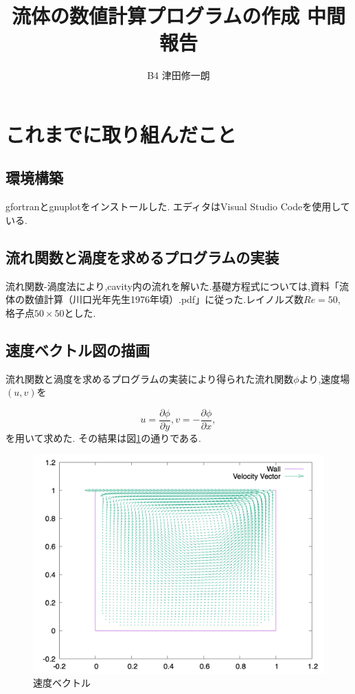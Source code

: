 \documentclass[upLaTeX,a4paper]{jsarticle}
\title{流体の数値計算プログラムの作成 中間報告}
\author{B4 津田修一朗}
\date{}
\begin{document}
\maketitle

\section{これまでに取り組んだこと}
\subsection{環境構築}
gfortranとgnuplotをインストールした.
エディタはVisual Studio Codeを使用している.

\subsection{流れ関数と渦度を求めるプログラムの実装}
流れ関数-渦度法により,cavity内の流れを解いた.基礎方程式については,資料「流体の数値計算（川口光年先生1976年頃）.pdf」に従った.レイノルズ数$Re = 50$, 格子点$50\times 50$とした.

\subsection{速度ベクトル図の描画}
流れ関数と渦度を求めるプログラムの実装により得られた流れ関数$\phi$より,速度場$(u, v)$を

\begin{equation}
  u = \frac{\partial \phi}{\partial y}, v = - \frac{\partial \phi}{\partial x},
\end{equation}
を用いて求めた.
その結果は図\ref{fig:velocity_vector}の通りである.
\begin{figure}[H]
  \includegraphics[width=15cm]{outputs/img/velocity_vector_50.png}
  \caption{速度ベクトル}
  \label{fig:velocity_vector}
\end{figure}
\end{document}
